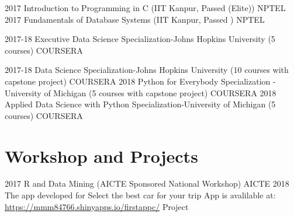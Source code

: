 \documentclass[]{cv-style}          %
\begin{document}
\begin{entrylist}
\entry
{2017}
{Introduction to Programming in C (IIT Kanpur, Passed (Elite)) }
{NPTEL}
{\vspace{-0.3cm}}
\entry
{2017}
{Fundamentals of Database Systems (IIT Kanpur, Passed )}
{NPTEL}
{\vspace{-0.3cm}}

\entry
{2017-18}
{Executive Data Science Specialization-Johns Hopkins University (5 courses)}
{COURSERA}
{\vspace{-0.3cm}}

\entry
{2017-18}
{Data Science Specialization-Johns Hopkins University (10 courses with capstone project)}
{COURSERA}
{\vspace{-0.3cm}}
\entry
{2018}
{Python for Everybody Specialization -University of Michigan (5 courses with capstone project)}
{COURSERA}
{\vspace{-0.3cm}}
\entry
{2018}
{Applied Data Science with Python Specialization-University of Michigan (5 courses)}
{COURSERA}
{\vspace{-0.3cm}}

\end{entrylist}

\section{Workshop and Projects}
\begin{entrylist}
\entry
{2017}
{R and Data Mining  (AICTE Sponsored National Workshop)}
{AICTE}
{\vspace{-0.3cm}}
\entry
{2018}
{The app developed for Select the best car for your trip App is avalilable at:   \newline 
\url{https://mmm84766.shinyapps.io/firstappc/}}
{Project}
{\vspace{-0.3cm}}


\end{entrylist}



\end{document}
